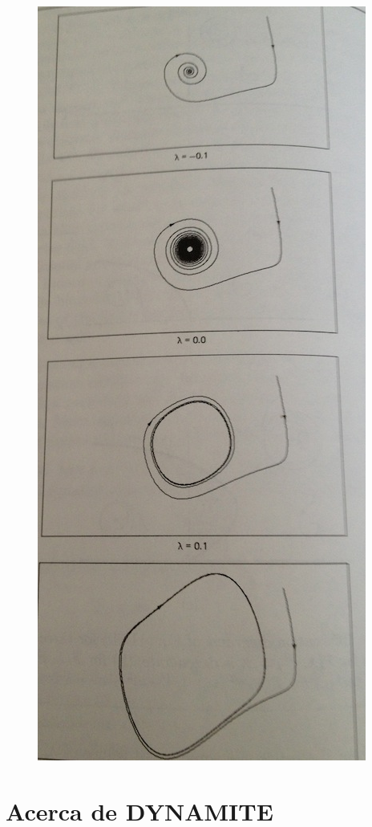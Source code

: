 \documentclass[11pt]{book}
\theoremstyle{definition}
\numberwithin{definition}{section}
\theoremstyle{theorem}
\numberwithin{theorem}{section}
\numberwithin{lemma}{section}
\numberwithin{corollary}{section}
\theoremstyle{plain}
\numberwithin{example}{section}
\begin{document}
\begin{figure}[!ht] \centering
	\includegraphics[scale=0.5]{figures/vanderpol-hopfbifurcation.jpg}
\end{figure}


\chapter{Acerca de DYNAMITE}
\end{document}
